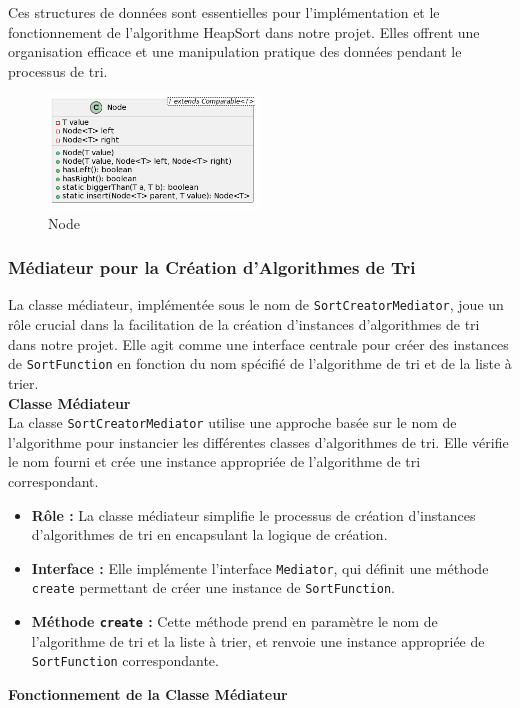 \documentclass[a4paper,12pt]{article}
\begin{document}
\begin{enumerate}[label=\textbf{\arabic*.} , font=\bfseries]
Ces structures de données sont essentielles pour l'implémentation et le fonctionnement de l'algorithme HeapSort dans notre projet. Elles offrent une organisation efficace et une manipulation pratique des données pendant le processus de tri.
\begin{figure}[h]
    \centering
    \includegraphics[width=0.5\textwidth]{Node.png}
    \caption{Node}
    \label{fig:mon_image}
\end{figure}
\end{enumerate}
\subsubsection{Médiateur pour la Création d'Algorithmes de Tri}

La classe médiateur, implémentée sous le nom de \texttt{SortCreatorMediator}, joue un rôle crucial dans la facilitation de la création d'instances d'algorithmes de tri dans notre projet. Elle agit comme une interface centrale pour créer des instances de \texttt{SortFunction} en fonction du nom spécifié de l'algorithme de tri et de la liste à trier.\\

\textbf{Classe Médiateur}\\

La classe \texttt{SortCreatorMediator} utilise une approche basée sur le nom de l'algorithme pour instancier les différentes classes d'algorithmes de tri. Elle vérifie le nom fourni et crée une instance appropriée de l'algorithme de tri correspondant.

\begin{itemize}
\item \textbf{Rôle :} La classe médiateur simplifie le processus de création d'instances d'algorithmes de tri en encapsulant la logique de création.
\item \textbf{Interface :} Elle implémente l'interface \texttt{Mediator}, qui définit une méthode \texttt{create} permettant de créer une instance de \texttt{SortFunction}.
\item \textbf{Méthode \texttt{create} :} Cette méthode prend en paramètre le nom de l'algorithme de tri et la liste à trier, et renvoie une instance appropriée de \texttt{SortFunction} correspondante.\\
\end{itemize}
\textbf{Fonctionnement de la Classe Médiateur}\\
\end{document}
